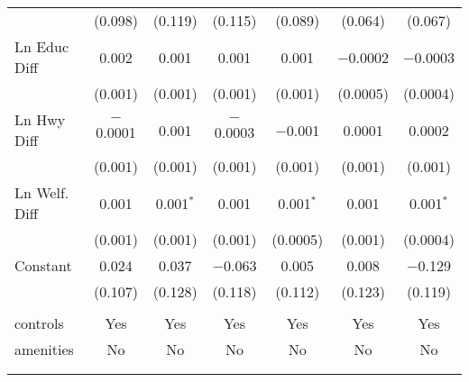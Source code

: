 \begin{table}[!htbp]
\begin{tabular}{@{\extracolsep{5pt}}lcccccc}
  & (0.098) & (0.119) & (0.115) & (0.089) & (0.064) & (0.067) \\ 
  Ln Educ Diff & 0.002 & 0.001 & 0.001 & 0.001 & $-$0.0002 & $-$0.0003 \\ 
  & (0.001) & (0.001) & (0.001) & (0.001) & (0.0005) & (0.0004) \\ 
  Ln Hwy Diff & $-$0.0001 & 0.001 & $-$0.0003 & $-$0.001 & 0.0001 & 0.0002 \\ 
  & (0.001) & (0.001) & (0.001) & (0.001) & (0.001) & (0.001) \\ 
  Ln Welf. Diff & 0.001 & 0.001$^{*}$ & 0.001 & 0.001$^{*}$ & 0.001 & 0.001$^{*}$ \\ 
  & (0.001) & (0.001) & (0.001) & (0.0005) & (0.001) & (0.0004) \\ 
  Constant & 0.024 & 0.037 & $-$0.063 & 0.005 & 0.008 & $-$0.129 \\ 
  & (0.107) & (0.128) & (0.118) & (0.112) & (0.123) & (0.119) \\ 
 \hline \\[-1.8ex] 
controls & Yes & Yes & Yes & Yes & Yes & Yes \\ 
amenities & No & No & No & No & No & No \\ 
\hline \\[-1.8ex] 
\hline 
\hline \\[-1.8ex] 
\end{tabular} 
\end{table} 
